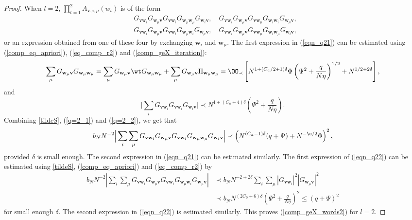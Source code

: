 \begin{proof}
When $l=2$, $\prod_{t=1}^2 A_{\mathbf v, i, \mu}(w_t)$ is of the form
\begin{align}
 & G_{\mathbf v\mathbf w_i} G_{\mathbf w_\mu \mathbf v} G_{\mathbf v \mathbf w_i} G_{\mathbf w_\mu\mathbf w_\mu} G_{\mathbf w_i\mathbf v}, \quad   G_{\mathbf v\mathbf w_i} G_{\mathbf w_\mu \mathbf v} G_{\mathbf v \mathbf w_\mu} G_{\mathbf w_i \mathbf w_i} G_{\mathbf w_\mu\mathbf v}, \label{eqn_q21}  \\
 &  G_{\mathbf v\mathbf w_i} G_{\mathbf w_\mu \mathbf v} G_{\mathbf v \mathbf w_i} G_{\mathbf w_\mu \mathbf w_i} G_{\mathbf w_\mu\mathbf v}, \quad   G_{\mathbf v\mathbf w_i} G_{\mathbf w_\mu \mathbf v} G_{\mathbf v \mathbf w_\mu} G_{\mathbf w_i \mathbf w_\mu} G_{\mathbf w_i\mathbf v},\label{eqn_q22}
\end{align}
or an expression obtained from one of these four by exchanging $\mathbf w_i$ and $\mathbf w_\mu$. The first expression in (\ref{eqn_q21}) can be estimated using (\ref{comp_eq_apriori}), (\ref{eq_comp_r2}) and (\ref{comp_geX_iteration}):
\begin{equation}
\label{q=2_1}\sum_\mu G_{\mathbf w_\mu \mathbf v} G_{\mathbf w_\mu\mathbf w_\mu}=\sum_\mu G_{\mathbf w_\mu \mathbf v}\wt G_{\mathbf w_\mu\mathbf w_\mu}+\sum_\mu  G_{\mathbf w_\mu \mathbf v}\Pi_{\mathbf w_\mu\mathbf w_\mu}=\OO_\prec\left[N^{1+(C_a/2+1)\delta}\Phi\left(\Psi^2 + \frac{q}{N\eta}\right)^{1/2}+ N^{1/2+2\delta}\right],
\end{equation}
and
\begin{equation}\label{q=2_2}
\Big|\sum_i G_{\mathbf v\mathbf w_i} G_{\mathbf v \mathbf w_i} G_{\mathbf w_i\mathbf v}\Big|\prec N^{1+(C_a+4)\delta} \left(\Psi^2 + \frac{q}{N\eta}\right).
\end{equation}
Combining \eqref{tildeS}, (\ref{q=2_1}) and (\ref{q=2_2}), we get that 
\[b_N N^{-2}\Big|\sum_i\sum_\mu G_{\mathbf v\mathbf w_i} G_{\mathbf w_\mu \mathbf v} G_{\mathbf v \mathbf w_i} G_{\mathbf w_\mu\mathbf w_\mu} G_{\mathbf w_i\mathbf v}\Big| \prec \left(N^{(C_a-1)\delta}(q+\Psi) + N^{-\e/2}\Phi\right)^2,\]
provided $\delta$ is small enough. The second expression in (\ref{eqn_q21}) can be estimated similarly. The first expression of (\ref{eqn_q22}) can be estimated using \eqref{tildeS}, (\ref{comp_eq_apriori}) and (\ref{eq_comp_r2}) by
\begin{equation*}
\begin{split}
b_N N^{-2}\left|\sum_i\sum_\mu  G_{\mathbf v\mathbf w_i} G_{\mathbf w_\mu \mathbf v} G_{\mathbf v \mathbf w_i} G_{\mathbf w_\mu \mathbf w_i} G_{\mathbf w_\mu\mathbf v}\right|& \prec b_N N^{-2+2\delta}\sum_i\sum_\mu\left| G_{\mathbf v\mathbf w_i}\right|^2\left| G_{\mathbf w_\mu\mathbf v}\right|^2 \\
& \prec b_N N^{(2C_0+6)\delta}\left( \Psi^2 +\frac{q}{N\eta}\right)^2 \le (q +\Psi)^2
\end{split}
\end{equation*}
for small enough $\delta$. The second expression in (\ref{eqn_q22}) is estimated similarly.  This proves (\ref{comp_geX_words2}) for $l=2$.


\end{proof}
